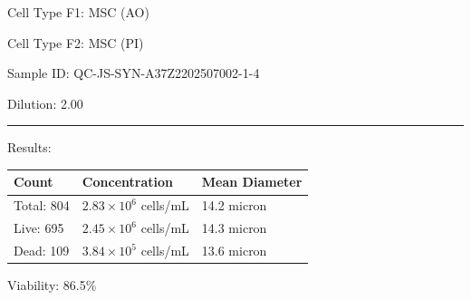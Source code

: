 \documentclass[UTF8,10pt,a4paper,fontset=fandol]{ctexart}
\newcommand{\fieldvalue}[1]{#1}
\begin{document}
\begin{center}
\begin{center}
\medskip
\noindent
Cell Type F1:
\fieldvalue{MSC (AO)}

\noindent
Cell Type F2:
\fieldvalue{MSC (PI)}

\medskip
\noindent
Sample ID:
\fieldvalue{QC-JS-SYN-A37Z2202507002-1-4}

\noindent
Dilution:
\fieldvalue{2.00}

\medskip
\noindent\rule{\textwidth}{0.4pt}

\noindent Results:

\medskip
\small
\begin{tabularx}{\textwidth}{@{}>{\raggedright\arraybackslash}X
                              >{\raggedright\arraybackslash}X
                              >{\raggedright\arraybackslash}X@{}}
\textbf{Count} & \textbf{Concentration} & \textbf{Mean Diameter} \\[-2pt]
\hline
\fieldvalue{Total: 804}
&
\fieldvalue{$2.83\times10^{6}$ cells/mL}
&
\fieldvalue{14.2 micron}
\\
\fieldvalue{Live: 695}
&
\fieldvalue{$2.45\times10^{6}$ cells/mL}
&
\fieldvalue{14.3 micron}
\\
\fieldvalue{Dead: 109}
&
\fieldvalue{$3.84\times10^{5}$ cells/mL}
&
\fieldvalue{13.6 micron}
\end{tabularx}

\medskip
\noindent
\fieldvalue{Viability: 86.5\%}


\end{center}
\end{center}
\end{document}
